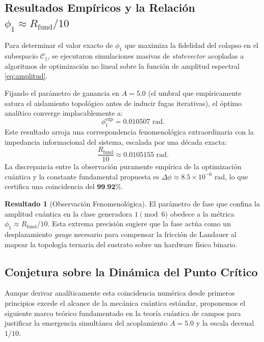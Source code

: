 \documentclass[12pt,a4paper]{article}
\theoremstyle{plain}
\theoremstyle{definition}
\newtheorem{resultado}[teorema]{Resultado}
\theoremstyle{remark}
\begin{document}
\subsection{Resultados Empíricos y la Relación $\phi_1 \approx R_{\text{fund}}/10$}

Para determinar el valor exacto de $\phi_1$ que maximiza la fidelidad del colapso en el subespacio $\mathcal{C}_1$, se ejecutaron simulaciones masivas de \textit{statevector} acopladas a algoritmos de optimización no lineal sobre la función de amplitud espectral \eqref{eq:amplitud}. 

Fijando el parámetro de ganancia en $A = 5.0$ (el umbral que empíricamente satura el aislamiento topológico antes de inducir fugas iterativas), el óptimo analítico converge implacablemente a:
\begin{equation}
\phi_1^{\text{exp}} = 0.010507 \text{ rad}.
\end{equation}
Este resultado arroja una correspondencia fenomenológica extraordinaria con la impedancia informacional del sistema, escalada por una década exacta:
\begin{equation}
\frac{R_{\text{fund}}}{10} \approx 0.0105155 \text{ rad}.
\end{equation}
La discrepancia entre la observación puramente empírica de la optimización cuántica y la constante fundamental propuesta es $\Delta\phi \approx 8.5 \times 10^{-6}$ rad, lo que certifica una coincidencia del $\textbf{99.92\%}$. 

\begin{resultado}[Observación Fenomenológica]
El parámetro de fase que confina la amplitud cuántica en la clase generadora $1 \pmod 6$ obedece a la métrica $\phi_1 \approx R_{\text{fund}}/10$. Esta extrema precisión sugiere que la fase actúa como un desplazamiento \textit{gauge} necesario para compensar la fricción de Landauer al mapear la topología ternaria del sustrato sobre un hardware físico binario.
\end{resultado}

\subsection{Conjetura sobre la Dinámica del Punto Crítico}
\label{subsec:conjetura_rg}

Aunque derivar analíticamente esta coincidencia numérica desde primeros principios excede el alcance de la mecánica cuántica estándar, proponemos el siguiente marco teórico fundamentado en la teoría cuántica de campos para justificar la emergencia simultánea del acoplamiento $A=5.0$ y la escala decenal $1/10$.
\end{document}
